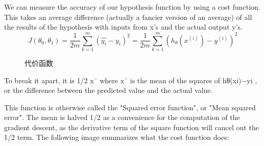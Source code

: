 \documentclass{article}
\begin{document}
\begin{CJK}{UTF8}{gbsn}
We can measure the accuracy of our hypothesis function by using a cost function. This takes an average difference (actually a fancier version of an average) of all the results of the hypothesis with inputs from x's and the actual output y's.
\begin{equation*}
  J(\theta_0,\theta_1)=\frac{1}{2m}\sum_{k=1}^m{(\hat{y_i}-y_i)^2}=\frac{1}{2m}\sum_{k=1}^m{(h_\theta(x^{(i)})-y^{(i)})^2}
\end{equation*}
\begin{figure}[H]
\caption{代价函数}
\label{fig:10}
\end{figure}

To break it apart, it is 1/2 x¯ where x¯ is the mean of the squares of hθ(xi)−yi , or the difference between the predicted value and the actual value.

This function is otherwise called the "Squared error function", or "Mean squared error". The mean is halved 1/2 as a convenience for the computation of the gradient descent, as the derivative term of the square function will cancel out the 1/2 term. The following image summarizes what the cost function does: 


\end{CJK}
\end{document}
